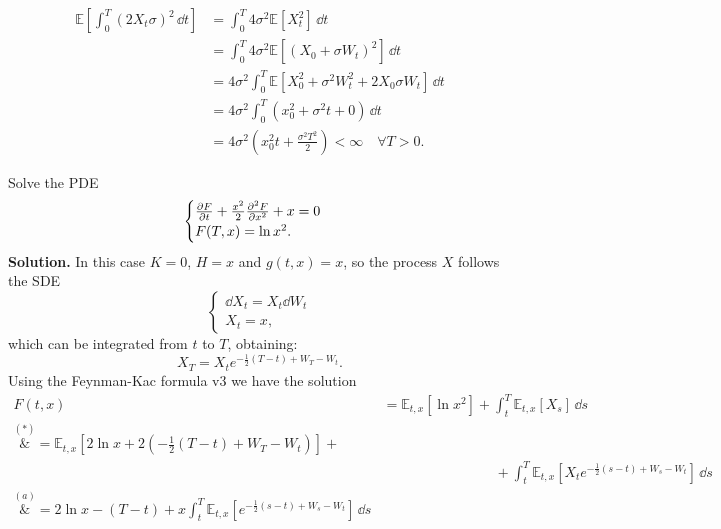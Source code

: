 \begin{example}{}{}{}
    \begin{align*}
        \mathbb{E}\left[\int^T_0 (2X_t\sigma)^2\,\dd t\right] &= \int^T_0 4\sigma^2\mathbb{E}[X_t^2]\,\dd t \\
        &=
        \int^T_0 4\sigma^2\mathbb{E}[(X_0+\sigma W_t)^2]\,\dd t \\
        &=
        4\sigma^2 \int^T_0 \mathbb{E}[X_0^2+\sigma^2 W_t^2 + 2X_0\sigma W_t]\,\dd t \\
        &=
        4\sigma^2 \int^T_0 (x_0^2+\sigma^2 t + 0)\,\dd t \\
        &=
        4\sigma^2\left(x_0^2 t +\frac{\sigma^2 T^2}{2}\right) < \infty \quad \forall T>0.
    \end{align*}
\end{example}
\begin{example}{}{}{}
    Solve the PDE
    \begin{equation*}
        \begin{cases}
        \pdv{F}{t}(t,x) + \frac{x^2}{2}\pdv[2]{F}{x}(t,x) + x = 0\\
        F(T,x) = \ln x^2.
        \end{cases}
    \end{equation*}
    \textbf{Solution.} In this case $K=0$, $H=x$ and $g(t,x)=x$, so the process $X$ follows the SDE
    \begin{equation*}
        \begin{cases}
        \dd X_t = X_t\dd W_t\\
        X_t = x,
        \end{cases}
    \end{equation*}
    which can be integrated from $t$ to $T$, obtaining:
    \begin{equation}\label{lin}
        X_T = X_t e^{-\frac{1}{2}(T-t)+W_T-W_t}. \tag{$\star$}
    \end{equation}
    Using the Feynman-Kac formula v3 we have the solution
    \begin{align*}
        F(t,x) &= \mathbb{E}_{t,x}[\ln x^2] + \int_t^T \mathbb{E}_{t,x}[X_s]\,\dd s \\
        \overset{(*)}&{=}
        \mathbb{E}_{t,x}\left[2\ln x + 2\left(-\frac{1}{2}(T-t)+W_T-W_t\right)\right] +\\
        &\qquad\qquad\qquad\qquad + \int_t^T \mathbb{E}_{t,x}[X_t e^{-\frac{1}{2}(s-t)+W_s-W_t}]\,\dd s \\
        \overset{(a)}&{=}
        2\ln x - (T-t) + x\int^T_t \mathbb{E}_{t,x}\left[e^{-\frac{1}{2}(s-t)+W_s-W_t}\right] \,\dd s \\

\end{align*}
\end{example}
